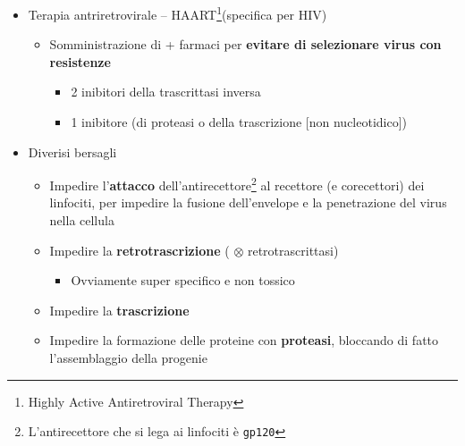 \documentclass[italian,]{article}
\providecommand{\tightlist}{%
  \setlength{\itemsep}{0pt}\setlength{\parskip}{0pt}}
\newcommand{\ini}[0]{ $\otimes$ }                                       %
\begin{document}
\begin{itemize}
\tightlist
\item
  Terapia antriretrovirale -- HAART\footnote{Highly Active
    Antiretroviral Therapy}(specifica per HIV)

  \begin{itemize}
  \tightlist
  \item
    Somministrazione di + farmaci per \textbf{evitare di selezionare
    virus con resistenze}

    \begin{itemize}
    \tightlist
    \item
      2 inibitori della trascrittasi inversa
    \item
      1 inibitore (di proteasi o della trascrizione {[}non
      nucleotidico{]})
    \end{itemize}
  \end{itemize}
\item
  Diverisi bersagli

  \begin{itemize}
  \tightlist
  \item
    Impedire l'\textbf{attacco} dell'antirecettore\footnote{L'antirecettore
      che si lega ai linfociti è \texttt{gp120}} al recettore (e
    corecettori) dei linfociti, per impedire la fusione dell'envelope e
    la penetrazione del virus nella cellula
  \item
    Impedire la \textbf{retrotrascrizione} (\ini retrotrascrittasi)

    \begin{itemize}
    \tightlist
    \item
      Ovviamente super specifico e non tossico
    \end{itemize}
  \item
    Impedire la \textbf{trascrizione}
  \item
    Impedire la formazione delle proteine con \textbf{proteasi},
    bloccando di fatto l'assemblaggio della progenie
  \end{itemize}
\end{itemize}
\end{document}
